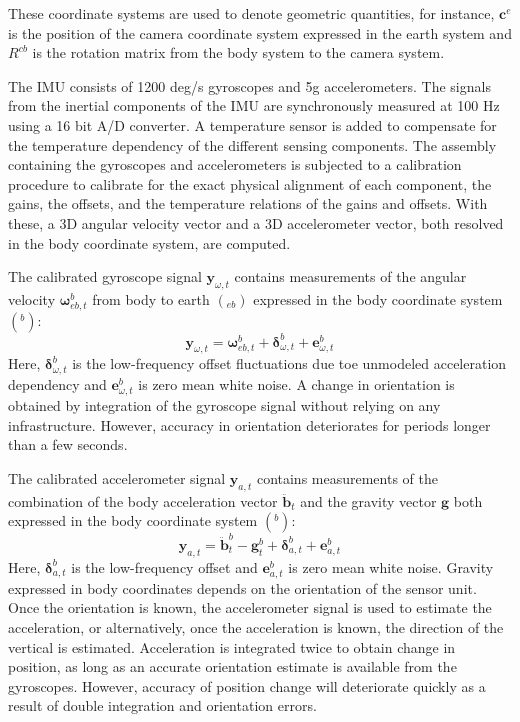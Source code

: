 These coordinate systems are used to denote geometric quantities, for instance, $ \bm{c}^e $ is the position of the camera coordinate system expressed in the earth system and $ R^{cb} $ is the rotation matrix from the body system to the camera system.

The IMU consists of 1200 deg/s gyroscopes and 5g accelerometers. The signals from the inertial components of the IMU are synchronously measured at 100 Hz using a 16 bit A/D converter. A temperature sensor is added to compensate for the temperature dependency of the different sensing components. The assembly containing the gyroscopes and accelerometers is subjected to a calibration procedure to calibrate for the exact physical alignment of each component, the gains, the offsets, and the temperature relations of the gains and offsets. With these, a 3D angular velocity vector and a 3D accelerometer vector, both resolved in the body coordinate system, are computed.

The calibrated gyroscope signal $ \bm{y}_{\omega,t} $ contains measurements of the angular velocity $ \bm{\omega}^b_{eb,t} $ from body to earth $ ( _{eb} ) $ expressed in the body coordinate system $ ( ^b ) $:
\begin{equation}
\bm{y}_{\omega,t} = \bm{\omega}^b_{eb,t} + \bm{\delta}^b_{\omega,t} + \bm{e}^b_{\omega,t}
\end{equation}
Here, $ \bm{\delta}^b_{\omega,t} $ is the low-frequency offset fluctuations due toe unmodeled acceleration dependency and $ \bm{e}^b_{\omega,t} $ is zero mean white noise. A change in orientation is obtained by integration of the gyroscope signal without relying on any infrastructure. However, accuracy in orientation deteriorates for periods longer than a few seconds. 

The calibrated accelerometer signal $ \bm{y}_{a,t} $ contains measurements of the  combination of the body acceleration vector $ \ddot{\bm{b}}_{t} $ and the gravity vector $ \bm{g} $ both expressed in the body coordinate system $ ( ^b ) $:
\begin{equation}
\bm{y}_{a,t} = \ddot{\bm{b}}^b_{t} - \bm{g}^b_{t} + \bm{\delta}^b_{a,t} + \bm{e}^b_{a,t}
\end{equation}
Here, $ \bm{\delta}^b_{a,t} $ is the low-frequency offset and $ \bm{e}^b_{a,t} $ is zero mean white noise. Gravity expressed in body coordinates depends on the orientation of the sensor unit. Once the orientation is known, the accelerometer signal is used to estimate the acceleration, or alternatively, once the acceleration is known, the direction of the vertical is estimated. Acceleration is integrated twice to obtain change in position, as long as an accurate orientation estimate is available from the gyroscopes. However, accuracy of position change will deteriorate quickly as a result of double integration and orientation errors. 

